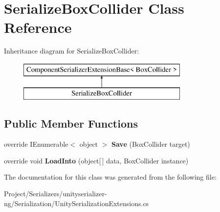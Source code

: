\hypertarget{class_serialize_box_collider}{}\section{Serialize\+Box\+Collider Class Reference}
\label{class_serialize_box_collider}
Inheritance diagram for Serialize\+Box\+Collider\+:\begin{figure}[H]
\begin{center}
\leavevmode
\includegraphics[height=2.000000cm]{class_serialize_box_collider}
\end{center}
\end{figure}
\subsection*{Public Member Functions}
\begin{DoxyCompactItemize}
\item 
\mbox{\label{class_serialize_box_collider_a221fddae2d26e61cf659f0f684fdec59}} 
override I\+Enumerable$<$ object $>$ {\bfseries Save} (Box\+Collider target)
\item 
\mbox{\label{class_serialize_box_collider_a4e2d9de367e71f67ae907db73c2978a7}} 
override void {\bfseries Load\+Into} (object\mbox{[}$\,$\mbox{]} data, Box\+Collider instance)
\end{DoxyCompactItemize}


The documentation for this class was generated from the following file\+:\begin{DoxyCompactItemize}
\item 
Project/\+Serializers/unityserializer-\/ng/\+Serialization/Unity\+Serialization\+Extensions.\+cs\end{DoxyCompactItemize}
